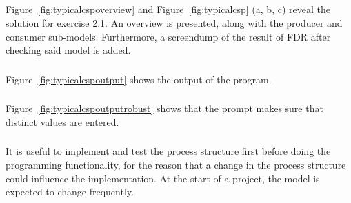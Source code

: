 \documentclass[a4paper,twoside,11pt]{article}
\begin{document}
\subsection{}
\subsubsection{}
Figure~\ref{fig:typicalcspoverview} and Figure~\ref{fig:typicalcsp} (a, b, c) 
reveal the solution for exercise 2.1. An overview is presented, along with the 
producer and consumer sub-models.
Furthermore, a screendump of the result of FDR after checking said model is added.
\subsubsection{}
Figure~\ref{fig:typicalcspoutput} shows the output of the program.
\subsubsection{}
Figure~\ref{fig:typicalcspoutputrobust} shows that the prompt makes sure that distinct values are entered.
\subsubsection{}
It is useful to implement and test the process structure first before doing the
programming functionality, for the reason that a change in the process structure
could influence the implementation.
At the start of a project, the model is expected to change frequently.
\subsubsection{}
\end{document}
